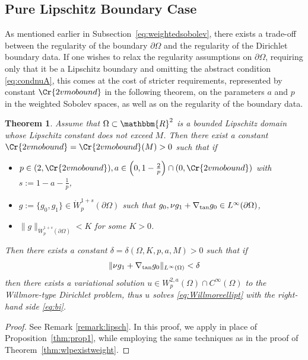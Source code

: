 \documentclass[12pt,a4paper,twoside]{article}
\newcommand{\R}{\mathbbm {R}}
\newtheorem{thm}{Theorem}
\begin{document}
\subsection{Pure Lipschitz Boundary Case}
\label{subsec:purelipsch} 
As mentioned earlier in Subsection~\ref{eq:weightedsobolev}, there exists a trade-off between the regularity of the boundary $\partial\Omega$ and the regularity of the Dirichlet boundary data. If one wishes to relax the regularity assumptions on $\partial\Omega$, requiring only that it be a Lipschitz boundary and omitting the abstract condition \eqref{eq:condnuA}, this comes at the cost of stricter requirements, represented by constant $\Cr{2vmobound}$ in the following theorem, on the parameters $a$ and $p$  in the weighted Sobolev spaces, as well as on the regularity of the boundary data.
\setcounter{thm}{1}
\begin{thm}
Assume that $\Omega\subset \R^2$ is a bounded Lipschitz domain whose Lipschitz constant
does not exceed $M$. Then there exist a constant $\Cr{2vmobound}=\Cr{2vmobound}(M)>0$ such that if
\begin{itemize}
    \item  $p\in(2,\Cr{2vmobound}), a\in \Big(0,1-\frac{2}{p}\Big)\cap(0,\Cr{2vmobound})$ with $s:=1-a-\frac{1}{p}$,
    \item $g:=\{g_0,g_1\}\in \dot W^{1+s}_p(\partial\Omega)$ such that $g_0, \nu g_1+\nabla_{\rm tan} g_0\in L^{\infty}(\partial\Omega)$,
    \item $\|g\|_{\dot W^{1+s}_p(\partial\Omega)} <K$ for some $K>0$.
\end{itemize}

Then there exists a constant $\delta=\delta(\Omega,K,p,a,M)>0$ such that if 
\begin{align*}
    \|\nu g_1+\nabla_{\rm tan} g_0\|_{L^\infty(\Omega)}<\delta
\end{align*}
then there exists a variational solution $u\in {W^{2,a}_p(\Omega)}\cap C^\infty(\Omega)$ to the Willmore-type Dirichlet problem, thus $u$ solves \eqref{eq:Willmoreellipt} with the right-hand side \eqref{eq:bi}.
\end{thm}
\begin{proof} See Remark \ref{remark:lipsch}. In this proof, we apply \cite[Theorem 2, p. 44 ]{maz2011recent} in place of Proposition~\ref{thm:prop1}, while employing the same techniques as in the proof of Theorem~\ref{thm:wlpexistweight}.
\end{proof}
\end{document}
